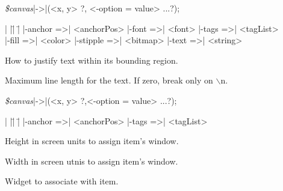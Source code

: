 {\samepage
{\it \$canvas}|->|(<x, y> ?, <-option =\> value> ...?);
\begin{tabbing}
|                   |\=|                |\= \kill
|-anchor =>| <anchorPos>  \> |-font =>| <font>      \> |-tags =>| <tagList> \\
|-fill =>| <color>        \> |-stipple =>| <bitmap> \> |-text =>| <string> \\
\end{tabbing}
}
\vspace{-10pt}

\begin{enum}{1cm}

How to justify text within its bounding region.

Maximum line length for the text. If zero, break only on $\backslash$n.

\end{enum}
\vskip5pt

{\samepage
{\it \$canvas}|->|(<x, y> ?,<-option =\> value> ...?);
\begin{tabbing}
|                   |\=|                |\= \kill
|-anchor =>| <anchorPos>  \> |-tags =>| <tagList> \\
\end{tabbing}
}
\vspace{-10pt}

\begin{enum}{4cm}

Height in screen units to assign item's window.

Width in screen utnis to assign item's window.

Widget to associate with item.

\end{enum}


